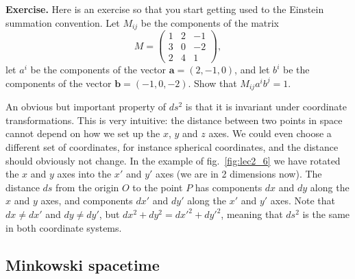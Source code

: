 \par\vspace{\baselineskip}

{\bf Exercise.} Here is an exercise so that you start getting used to the Einstein summation convention. Let $M_{ij}$ be the components of the matrix
\begin{equation}
M=\left( \begin{array}{ccc} 1 & 2 & -1 \\ 
3 & 0 & -2 \\
2 & 4 & 1 \end{array} \right),
\end{equation}
let $a^i$ be the components of the vector $\mathbf{a}=(2,-1,0)$, and let $b^i$ be the components of the vector $\mathbf{b}=(-1,0,-2)$. Show that $M_{ij}a^ib^j=1$.

\par\vspace{\baselineskip}

An obvious but important property of $ds^2$ is that it is invariant under coordinate transformations. This is very intuitive: the distance between two points in space cannot depend on how we set up the $x$, $y$ and $z$ axes. We could even choose a different set of coordinates, for instance spherical coordinates, and the distance should obviously not change. In the example of fig.\ \ref{fig:lec2_6} we have rotated the $x$ and $y$ axes into the $x'$ and $y'$ axes (we are in 2 dimensions now). The distance $ds$ from the origin $O$ to the point $P$ has components $dx$ and $dy$ along the $x$ and $y$ axes, and components $dx'$ and $dy'$ along the $x'$ and $y'$ axes. Note that $dx\neq dx'$ and $dy\neq dy'$, but $dx^2+dy^2=dx'^2+dy'^2$, meaning that $ds^2$ is the same in both coordinate systems.

\subsection{Minkowski spacetime}

